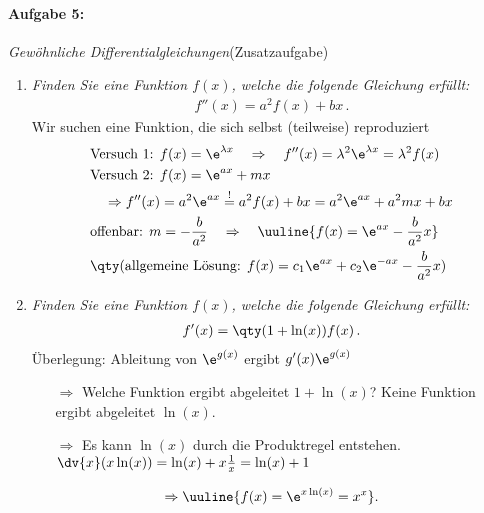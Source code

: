 \paragraph{Aufgabe 5: } \emph{Gewöhnliche Differentialgleichungen}\hfill (Zusatzaufgabe)\\[0.2cm]
\begin{enumerate}[label=(\alph*)]
\item \emph{Finden Sie eine Funktion $f(x)$, welche die folgende Gleichung erfüllt:}
\begin{align*}
f''(x)=a^2f(x)+bx\,.
\end{align*}
Wir suchen eine Funktion, die sich selbst (teilweise) reproduziert 
\begin{align}
    &\text{Versuch 1: } f(x) = \e^{\lambda x} \quad \Rightarrow \quad f''(x) = \lambda^2 \e^{\lambda x} = \lambda^2 f(x) \\
    &\text{Versuch 2: } f(x) = \e^{ax} + mx  \\
    &\quad \Rightarrow f''(x) = a^2 \e^{ax} \overset{!}{=} a^2 f(x) + bx = a^2 \e^{ax} + a^2 mx + bx \\
    &\text{offenbar: } m = -\frac{b}{a^2} \quad \Rightarrow \quad \uuline{f(x) = \e^{ax} - \frac{b}{a^2} x}\\
    &\qty(\text{allgemeine Lösung: } f(x) = c_1 \e^{ax} + c_2 \e^{-ax} - \frac{b}{a^2} x)
\end{align}
\item \emph{Finden Sie eine Funktion $f(x)$, welche die folgende Gleichung erfüllt:}
\begin{align*}
f'(x)=\qty(1+\ln(x))f(x)\,.
\end{align*}
Überlegung: Ableitung von $\e^{g(x)}$ ergibt $g'(x) \e^{g(x)}$
\begin{itemize}
    \item[$\Rightarrow$] Welche Funktion ergibt abgeleitet $1+ \ln(x)$? Keine Funktion ergibt abgeleitet $\ln(x)$. 
    \item[$\Rightarrow$] Es kann $\ln(x)$ durch die Produktregel entstehen. \\
    $\dv{x} (x \ln(x)) = \ln(x) + x \frac{1}{x} = \ln(x)+1$ 
\end{itemize}
\begin{align}
    \Rightarrow \uuline{f(x) = \e^{x \ln(x)} = x^x}.
\end{align}
\end{enumerate}
